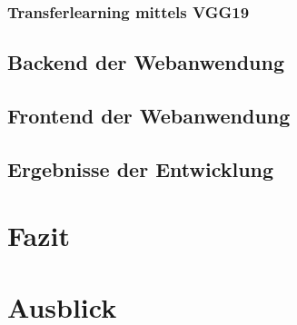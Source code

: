 \documentclass[11pt,bibliography=totocnumbered]{scrartcl}
\begin{document}
\subsubsection{Transferlearning mittels VGG19}
\subsection{Backend der Webanwendung}
\subsection{Frontend der Webanwendung}
\subsection{Ergebnisse der Entwicklung}
\section{Fazit} 
\section{Ausblick}
\setcounter{biburllcpenalty}{7000}
\setcounter{biburlucpenalty}{8000}
\printbibliography[title=Quellen]
\end{document}
